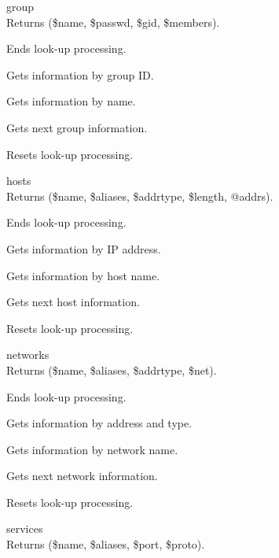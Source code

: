 \documentclass{refbase}
\begin{document}
{\vskip6pt\largesl group} \\
Returns (\$name, \$passwd, \$gid, \$members).

\begin{enum}{6cm}

Ends look-up processing.

Gets information by group ID. 

Gets information by name.

Gets next group information.

Resets look-up processing.

\end{enum}

{\vskip6pt\largesl hosts} \\
Returns (\$name, \$aliases, \$addrtype, \$length, @addrs).

\begin{enum}{6cm}

Ends look-up processing.

Gets information by IP address.

Gets information by host name.

Gets next host information.

Resets look-up processing.

\end{enum}

{\vskip6pt\largesl networks} \\
Returns (\$name, \$aliases, \$addrtype, \$net).

\begin{enum}{6cm}

Ends look-up processing.

Gets information by address and type.

Gets information by network name.

Gets next network information.

Resets look-up processing.

\end{enum}

{\vskip6pt\largesl services} \\
Returns (\$name, \$aliases, \$port, \$proto).
\end{document}
